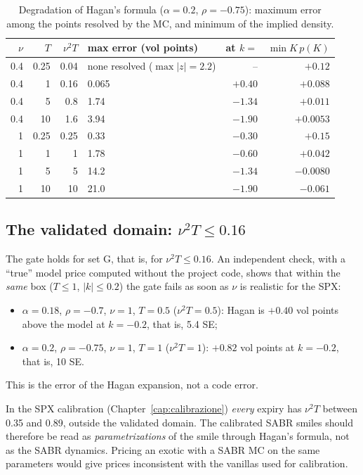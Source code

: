 \begin{table}[t]
\centering
\small
\caption{Degradation of Hagan's formula ($\alpha=0.2$, $\rho=-0.75$): maximum error among the points resolved by
the MC, and minimum of the implied density.}
\label{tab:sabr-degr}
\begin{tabular*}{\textwidth}{@{\extracolsep{\fill}}rrrlrr@{}}
\toprule
$\nu$ & $T$ & $\nu^2T$ & max error (vol points) & at $k=$ & $\min K\,p(K)$\\
\midrule
0.4 & 0.25 & 0.04 & none resolved ($\max|z|=2.2$) & -- & $+0.12$\\
0.4 & 1 & 0.16 & 0.065 & $+0.40$ & $+0.088$\\
0.4 & 5 & 0.8 & 1.74 & $-1.34$ & $+0.011$\\
0.4 & 10 & 1.6 & 3.94 & $-1.90$ & $+0.0053$\\
1 & 0.25 & 0.25 & 0.33 & $-0.30$ & $+0.15$\\
1 & 1 & 1 & 1.78 & $-0.60$ & $+0.042$\\
1 & 5 & 5 & 14.2 & $-1.34$ & $-0.0080$\\
1 & 10 & 10 & 21.0 & $-1.90$ & $-0.061$\\
\bottomrule
\end{tabular*}
\end{table}

\subsection{\texorpdfstring{The validated domain: $\nu^2T\le0.16$}{The validated domain: ν²T ≤ 0.16}}
The gate holds for set G, that is, for $\nu^2T\le0.16$. An independent check, with a ``true'' model price computed
without the project code, shows that within the \emph{same} box ($T\le1$, $|k|\le0.2$) the gate fails as soon as
$\nu$ is realistic for the SPX:
\begin{itemize}
\item $\alpha=0.18$, $\rho=-0.7$, $\nu=1$, $T=0.5$ ($\nu^2T=0.5$): Hagan is $+0.40$ vol points above the model at
$k=-0.2$, that is, 5.4 SE;
\item $\alpha=0.2$, $\rho=-0.75$, $\nu=1$, $T=1$ ($\nu^2T=1$): $+0.82$ vol points at $k=-0.2$, that is, 10 SE.
\end{itemize}
This is the error of the Hagan expansion, not a code error.

\begin{attenzione}[title={Hagan as a parametrization, not as a model}]
In the SPX calibration (Chapter~\ref{cap:calibrazione}) \emph{every} expiry has $\nu^2T$ between 0.35 and 0.89,
outside the validated domain. The calibrated SABR smiles should therefore be read as \emph{parametrizations} of the
smile through Hagan's formula, not as the SABR dynamics. Pricing an exotic with a SABR MC on the same parameters
would give prices inconsistent with the vanillas used for calibration.
\end{attenzione}

